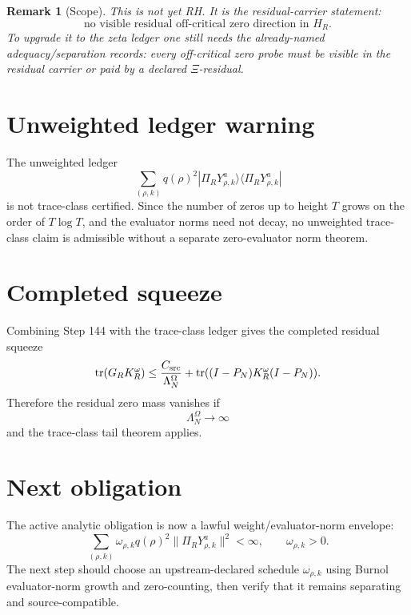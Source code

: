 \documentclass[11pt]{article}
\newtheorem{remark}{Remark}
\begin{document}
\begin{remark}[Scope]
This is not yet RH.  It is the residual-carrier statement:
\[
\text{no visible residual off-critical zero direction in }H_R.
\]
To upgrade it to the zeta ledger one still needs the already-named adequacy/separation records: every off-critical zero probe must be visible in the residual carrier or paid by a declared $\Xi$-residual.
\end{remark}

\section{Unweighted ledger warning}
The unweighted ledger
\[
\sum_{(\rho,k)}q(\rho)^2|\Pi_RY^a_{\rho,k}\rangle\langle\Pi_RY^a_{\rho,k}|
\]
is not trace-class certified.  Since the number of zeros up to height $T$ grows on the order of $T\log T$, and the evaluator norms need not decay, no unweighted trace-class claim is admissible without a separate zero-evaluator norm theorem.

\section{Completed squeeze}
Combining Step 144 with the trace-class ledger gives the completed residual squeeze
\[
\operatorname{tr}(G_RK_R^\omega)
\le
\frac{C_{\rm src}}{\Lambda_N^\Omega}
+
\operatorname{tr}((I-P_N)K_R^\omega(I-P_N)).
\]
Therefore the residual zero mass vanishes if
\[
\Lambda_N^\Omega\to\infty
\]
and the trace-class tail theorem applies.

\section{Next obligation}
The active analytic obligation is now a lawful weight/evaluator-norm envelope:
\[
\sum_{(\rho,k)}\omega_{\rho,k}q(\rho)^2\|\Pi_RY^a_{\rho,k}\|^2<\infty,
\qquad
\omega_{\rho,k}>0.
\]
The next step should choose an upstream-declared schedule $\omega_{\rho,k}$ using Burnol evaluator-norm growth and zero-counting, then verify that it remains separating and source-compatible.
\end{document}
